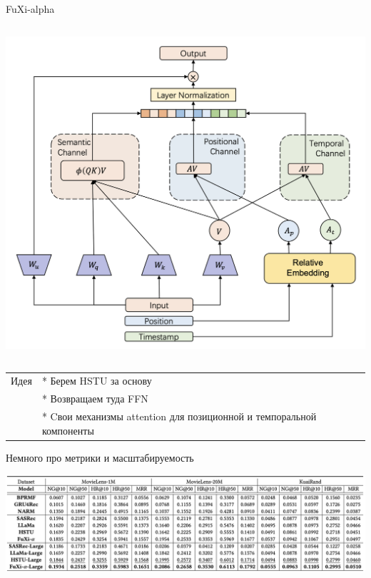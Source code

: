 \documentclass[11pt,aspectratio=169,handout]{beamer}
\begin{document}
\begin{frame}{FuXi-alpha \cite{ye2025fuxi}}
\begin{columns}
\begin{column}{0.5\textwidth}
\begin{center}
\includegraphics[scale=0.25]{images/fuxi-alpha-ams.png}
\end{center}
\end{column}
\end{columns}

\vfill
\begin{small}
\begin{tabular}{l l}
Идея & * Берем HSTU за основу\\
& * Возвращаем туда FFN\\
& * Cвои механизмы attention для позиционной и темпоральной компоненты
\end{tabular}
\end{small}
\end{frame}


\begin{frame}{Немного про метрики и масштабируемость}

\begin{center}
\includegraphics[scale=0.3]{images/fuxi_alpha_metrics.png}
\end{center}

\end{frame}
\end{document}
